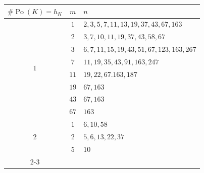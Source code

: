 \documentclass[12pt]{amsart}
\theoremstyle{definition}
\numberwithin{equation}{section}
\DeclareMathOperator{\Po}{Po}
\begin{document}
{\small

\begin{table}[!h]
	\begin{center}
		\begin{tabular}{|c | c|p{6.5cm}|} 
			\hline
			$\#\Po(K)=h_K$ & $m$ & $n$  \\ [0.5ex] 
			\hline \hline
			\multirow{8}{0.6em}{$1$} & $1$ & 
			$2,3,5,7,11,13,19,37,43,67,163$ \\ 	\cline{2-3} 
			& $2$ & $3,7,10,11,19,37,43,58,67$ \\  \cline{2-3} 
			& $3$ & $6,7,11,15,19,43,51,67,123,163,267$ \\ \cline{2-3} 
			& $7$ & $11,19,35,43,91,163,247$\\ \cline{2-3} 
			& $11$ &  $19,22,67.163,187$ \\ \cline{2-3} 
			& $19$ & $67,163$ \\ \cline{2-3} 
			& $43$& $67,163$ \\ \cline{2-3} 
			& $67$ & $163$ \\  
			\hline 
			\multirow{3}{0.6em}{$2$} & $1$ & $6,10,58$ \\ \cline{2-3} 
			& $2$ & $5,6,13,22,37$ \\ \cline{2-3} 
			& $5$ & $10$ \\  \cline{2-3} 

\end{tabular}
\end{center}
\end{table}}
\end{document}
